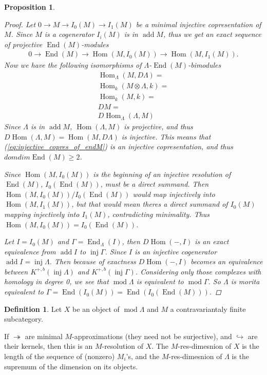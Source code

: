\documentclass[11pt, a4paper, english]{article}
\newtheorem{prop}[theorem]{Proposition}
\theoremstyle{definition}
\newtheorem{defn}[theorem]{Definition}
\DeclareMathOperator{\Hom}{Hom}
\DeclareMathOperator{\End}{End}
\DeclareMathOperator{\inj}{inj}
\DeclareMathOperator{\add}{add}
\def\mod{\operatorname{mod}}
\begin{document}
\begin{prop}
\begin{proof}
		Let $0 \to M \to I_0(M) \to I_1(M)$ be a minimal injective copresentation of $M$. Since $M$ is a cogenerator $I_i(M)$ is in $\add M$, thus we get an exact sequence of projective $\End(M)$-modules
		\begin{align} \label{eq:injective_copres_of_endM}
		0 \to \End(M) \to \Hom(M, I_0(M)) \to \Hom(M, I_1(M)).
		\end{align}
		Now we have the following isomorphisms of $\Lambda$-$\End(M)$-bimodules
		\begin{align*}
		\Hom_\Lambda(M, D\Lambda) =\\
		\Hom_k(M\otimes\Lambda, k) =\\
		\Hom_k(M, k) =\\
		DM =\\
		D\Hom_\Lambda(\Lambda, M)
		\end{align*}
		Since $\Lambda$ is in $\add M$, $\Hom(\Lambda, M)$ is projective, and thus $D\Hom(\Lambda, M) = \Hom(M, D\Lambda)$ is injective. This means that (\ref{eq:injective_copres_of_endM}) is an injective copresentation, and thus $domdim\End(M) \geq 2$.
		
		Since $\Hom(M, I_0(M))$ is the beginning of an injective resolution of $\End(M)$, $I_0(\End(M))$, must be a direct summand. Then $\Hom(M, I_0(M)) / I_0(\End(M))$ would map injectively into $\Hom(M, I_1(M))$, but that would mean theres a direct summand of $I_0(M)$ mapping injectively into $I_1(M)$, contradicting minimality. Thus $\Hom(M, I_0(M)) = I_0(\End(M))$.
		
		Let $I=I_0(M)$ and $\Gamma = \End_\Lambda(I)$, then $D\Hom(-,I)$ is an exact equivalence from $\add I$ to $\inj\Gamma$. Since $I$ is an injective cogenerator $\add I = \inj\Lambda$. Then because of exactness $D\Hom(-,I)$ becomes an equivalence between $K^{+,b}(\inj\Lambda)$ and $K^{+,b}(\inj\Gamma)$. Considering only those complexes with homology in degree 0, we see that $\mod\Lambda$ is equivalent to $\mod\Gamma$. So $\Lambda$ is morita equivalent to $\Gamma = \End(I_0(M)) = \End(I_0(\End(M)))$.
	\end{proof}
\end{prop}

\begin{defn}
	Let $X$ be an object of $\mod\Lambda$ and $M$ a contravariantaly finite subcategory.
	\begin{center}
	\end{center}
	If $\twoheadrightarrow$ are minimal $M$-approximations (they need not be surjective), and $\hookrightarrow$ are their kernels, then this is an $M$-resolution of $X$. The $M$-res-dimesnion of $X$ is the length of the sequence of (nonzero) $M_i$'s, and the $M$-res-dimesnion of $\Lambda$ is the supremum of the dimension on its objects.

\end{defn}
\end{document}
